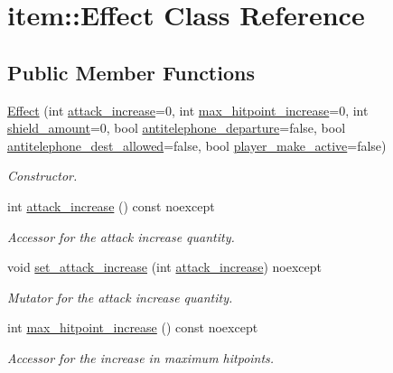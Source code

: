 \hypertarget{classitem_1_1_effect}{}\section{item\+:\+:Effect Class Reference}
\label{classitem_1_1_effect}
\subsection*{Public Member Functions}
\begin{DoxyCompactItemize}
\item 
\hyperlink{classitem_1_1_effect_a4260fb6ad9c8d3f63ca934fd4410d142}{Effect} (int \hyperlink{classitem_1_1_effect_adf8addd1eb339afebbcc9c7278b81d7c}{attack\+\_\+increase}=0, int \hyperlink{classitem_1_1_effect_ad74a155925b8072030afabf3bb13ba4a}{max\+\_\+hitpoint\+\_\+increase}=0, int \hyperlink{classitem_1_1_effect_a9a6f54d0eab7dd13b2ef14e04f6ddb56}{shield\+\_\+amount}=0, bool \hyperlink{classitem_1_1_effect_abd1c6fcf2c430da628787c535cdeb527}{antitelephone\+\_\+departure}=false, bool \hyperlink{classitem_1_1_effect_acb90e76e736868dd5307e8b6fe7e2e0d}{antitelephone\+\_\+dest\+\_\+allowed}=false, bool \hyperlink{classitem_1_1_effect_a05de623b49c24c11fdb765c61c0367d0}{player\+\_\+make\+\_\+active}=false)
\begin{DoxyCompactList}\small\item\em Constructor. \end{DoxyCompactList}\item 
int \hyperlink{classitem_1_1_effect_adf8addd1eb339afebbcc9c7278b81d7c}{attack\+\_\+increase} () const noexcept
\begin{DoxyCompactList}\small\item\em Accessor for the attack increase quantity. \end{DoxyCompactList}\item 
void \hyperlink{classitem_1_1_effect_a0a98eb24f70970c00b95cfa0a40f6a6a}{set\+\_\+attack\+\_\+increase} (int \hyperlink{classitem_1_1_effect_adf8addd1eb339afebbcc9c7278b81d7c}{attack\+\_\+increase}) noexcept
\begin{DoxyCompactList}\small\item\em Mutator for the attack increase quantity. \end{DoxyCompactList}\item 
int \hyperlink{classitem_1_1_effect_ad74a155925b8072030afabf3bb13ba4a}{max\+\_\+hitpoint\+\_\+increase} () const noexcept
\begin{DoxyCompactList}\small\item\em Accessor for the increase in maximum hitpoints. \end{DoxyCompactList}\item 

\end{DoxyCompactItemize}
